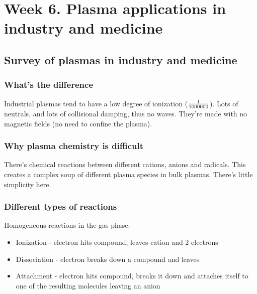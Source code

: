 \documentclass[PlasmaNotes.tex]{subfiles}
\begin{document}
\setcounter{section}{5}

\section{Week 6. Plasma applications in industry and medicine}

\subsection{Survey of plasmas in industry and medicine}

\subsubsection{What's the difference}

Industrial plasmas tend to have a low degree of ionization ($\frac{1}{1 000 000}$). Lots of neutrals, and lots of collisional damping, thus no waves. They're made with no magnetic fields (no need to confine the plasma). 

\subsubsection{Why plasma chemistry is difficult}

There's chemical reactions between different cations, anions and radicals. This creates a complex soup of different plasma species in bulk plasmas. There's little simplicity here.

\subsubsection{Different types of reactions}

Homogeneous reactions in the gas phase:
\begin{itemize}
\item Ionization - electron hits compound, leaves cation and 2 electrons
\item Dissociation - electron breaks down a compound and leaves 
\item Attachment - electron hits compound, breaks it down and attaches itself to one of the resulting molecules leaving an anion
\end{itemize}
\end{document}
